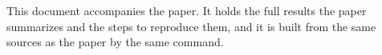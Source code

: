 This document accompanies the paper. It holds the full results the paper
summarizes and the steps to reproduce them, and it is built from the same
sources as the paper by the same command.
